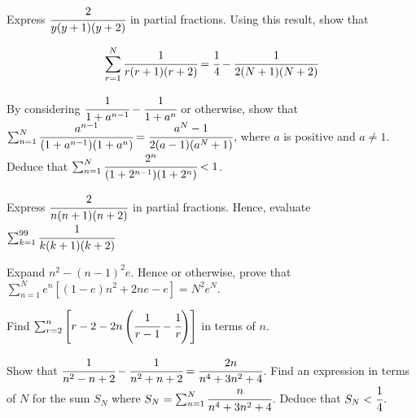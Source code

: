 \documentclass[letterpaper]{article}
\begin{document}
Express $\cfrac{2}{y(y+1)(y+2)}$ in partial fractions. Using this result, show that

\begin{align*}
\sum_{r=1}^N \cfrac{1}{r(r+1)(r+2)} = \cfrac{1}{4} - \cfrac{1}{2(N+1)(N+2)}
\end{align*}

By considering $\cfrac{1}{1 + a^{n-1}} - \cfrac{1}{1 + a^n}$ or otherwise, show that $\sum_{n=1}^N \cfrac{a^{n-1}}{(1 + a^{n-1})(1 + a^n)} = \cfrac{a^N - 1}{2(a-1)(a^N + 1)}$, where $a$ is positive and $a \neq 1$. Deduce that $\sum_{n=1}^N \cfrac{2^n}{(1 + 2^{n-1})(1 + 2^n)} < 1$.

Express $\cfrac{2}{n(n+1)(n+2)}$ in partial fractions. Hence, evaluate $\sum_{k=1}^{99} \cfrac{1}{k(k+1)(k+2)}$

Expand $n^2 - (n-1)^2 e$. Hence or otherwise, prove that $\sum_{n=1}^{N} e^n \left[(1-e)n^2 + 2ne - e\right] = N^2 e^N$.

Find $\sum_{r=2}^n \left[r - 2 -2n\left(\cfrac{1}{r-1} - \cfrac{1}{r}\right)\right]$ in terms of $n$.

Show that $\cfrac{1}{n^2 - n + 2} - \cfrac{1}{n^2 + n + 2} = \cfrac{2n}{n^4 + 3n^2 + 4}$. Find an expression in terms of $N$ for the sum $S_N$ where $S_N = \sum_{n=1}^N \cfrac{n}{n^4 + 3n^2 + 4}$. Deduce that $S_N < \cfrac{1}{4}$.
\end{document}
